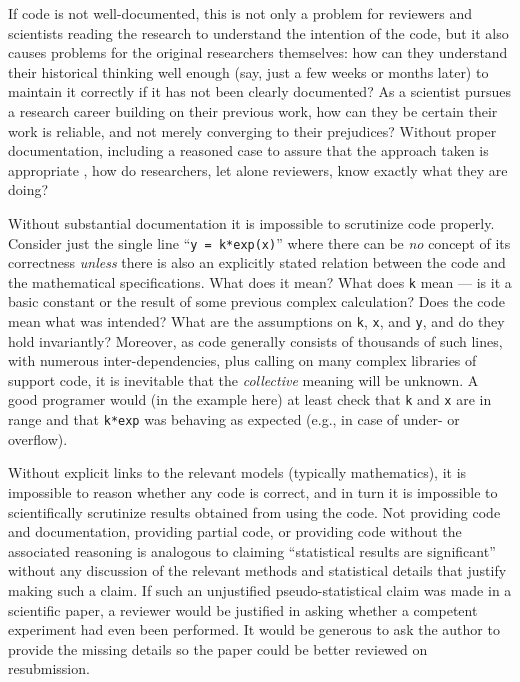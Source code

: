 \documentclass{comjnl}
\begin{document}
If code is not well-documented, this is not only a problem for reviewers and scientists reading the research to understand the intention of the code, but it also causes problems for the original researchers themselves: how can they understand their historical thinking well enough (say, just a few weeks or months later) to maintain it correctly if it has not been clearly documented? As a scientist pursues a research career building on their previous work, how can they be certain their work is reliable, and not merely converging to their  prejudices? Without proper documentation, including a reasoned case to assure that the approach taken is appropriate \cite{assurance-case}, how do researchers, let alone reviewers, know exactly what they are doing?

Without substantial documentation it is impossible to scrutinize code properly. Consider just the single line ``\texttt{y = k*exp(x)}'' where there can be \emph{no\/} concept of its correctness \emph{unless\/} there is also an explicitly stated relation between the code and the mathematical specifications. What does it mean? What does \texttt{k} mean --- is it a basic constant or the result of some previous complex calculation? Does the code mean what was intended? What are the assumptions on \texttt{k}, \texttt{x}, and \texttt{y}, and do they hold invariantly? Moreover, as code generally consists of thousands of such lines, with numerous inter-dependencies, plus calling on many complex libraries of support code, it is inevitable that the \emph{collective\/} meaning will be unknown. A good programer would (in the example here) at least check that \texttt{k} and \texttt{x} are in range and that \texttt{k*exp} was behaving as expected (e.g., in case of under- or overflow).

Without explicit links to the relevant models (typically mathematics), it is impossible to reason whether any code is correct, and in turn it is impossible to scientifically scrutinize results obtained from using the code. Not providing code and documentation, providing partial code, or providing code without the associated reasoning is analogous to claiming ``statistical results are significant'' without any discussion of the relevant methods and statistical details that justify making such a claim. If such an unjustified pseudo-statistical claim was made in a scientific paper, a reviewer would be justified in asking whether a competent experiment had even been performed. It would be generous to ask the author to provide the missing details so the paper could be better reviewed on resubmission. 
\end{document}
